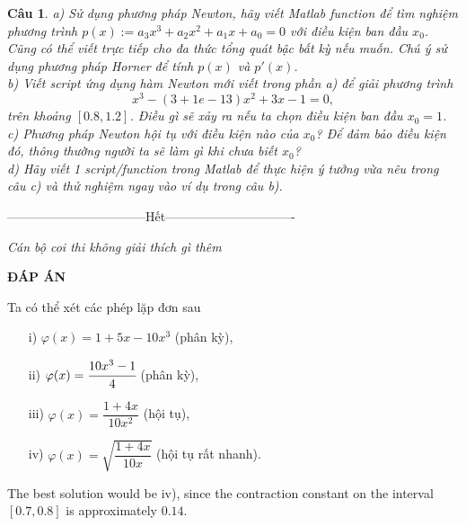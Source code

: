 \documentclass[11pt]{article}
\newtheorem{bt}{Câu}
\begin{document}
\begin{bt} %
	a) Sử dụng phương pháp Newton, hãy viết Matlab function để tìm nghiệm phương trình $p(x):=a_3 x^3 + a_2 x^2 + a_1 x + a_0 = 0$ với điều kiện ban đầu $x_0$. Cũng có thể viết trực tiếp cho đa thức tổng quát bậc bất kỳ nếu muốn. Chú ý sử dụng phương pháp Horner để tính $p(x)$ và $p'(x)$. \\
	b) Viết script ứng dụng hàm Newton mới viết trong phần a) để giải phương trình 
	\[ x^3 - (3+1e-13) x^2 + 3 x - 1 = 0, \]
	trên khoảng $[0.8,1.2]$. Điều gì sẽ xảy ra nếu ta chọn điều kiện ban đầu $x_0=1$. \\ 	
    c) Phương pháp Newton hội tụ với điều kiện nào của $x_0$? Để đảm bảo điều kiện đó, thông thường người ta sẽ làm gì khi chưa biết $x_0$?\\	
	d) Hãy viết 1 script/function trong Matlab để thực hiện ý tưởng vừa nêu trong câu c) và thử nghiệm ngay vào ví dụ trong câu b).
\end{bt}


\centerline{———————————Hết——————————-}


\vspace{1cm}
 {\it Cán bộ coi thi không giải thích gì thêm}\\
\newpage
\begin{center}
{\LARGE{\bf ĐÁP ÁN}}
\end{center}

\begin{sol}
Ta có thể xét các phép lặp đơn sau 
\begin{enumerate}
\item[i)] $\varphi(x) = 1+5x-10x^3$ (phân kỳ),
\item[ii)] $\varphi(x) = \cfrac{10x^3-1}{4}$ (phân kỳ),
\item[iii)] $\varphi(x) = \dfrac{1+4x}{10x^2}$ (hội tụ),
\item[iv)] $\varphi(x) = \sqrt{\dfrac{1+4x}{10x}}$ (hội tụ rất nhanh).
\end{enumerate}
%
The best solution would be iv), since the contraction constant on the interval $[0.7,0.8]$ is approximately $0.14$.
\end{sol}
   
\end{document}
